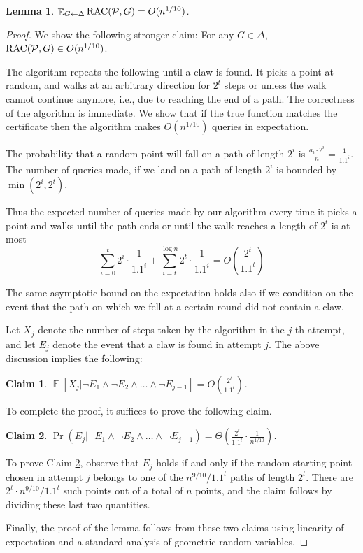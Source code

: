 \documentclass[11pt]{article}
\numberwithin{equation}{section}
\newtheorem{lemma}[lemma]{Lemma}
\newtheorem{claim}[claim]{Claim}
\newcommand\E{\mathop{\mathbb E}}
\renewcommand{\P}{\mathcal{P}}
\newcommand{\1}{\mathbf{1}}
\newcommand{\beq}{\begin{equation}}
\newcommand{\eeq}{\end{equation}}
\begin{document}
\begin{lemma}
$\E_{G \leftarrow \Delta} \RACC(\P, G) = O(n^{1/10})$.
\end{lemma}


\begin{proof}
We show the following stronger claim: For any $G \in \Delta$, $\RACC(\P, G) \in O(n^{1/10})$. 

The algorithm repeats the following until a claw is found. It picks a point at random, and walks at an arbitrary direction for $2^t$ steps or unless the walk cannot continue anymore, i.e., due to reaching the end of a path. The correctness of the algorithm is immediate. We show that if the true function matches the certificate then the algorithm makes $O(n^{1/10})$ queries in expectation.

The probability that a random point will fall on a path of length $2^i$ is $\frac{a_i \cdot 2^i}{n} = \frac{1}{1.1^i}$. The number of queries made, if we land on a path of length $2^i$ is bounded by $\min(2^i, 2^t)$. 

Thus the expected number of queries made by our algorithm every time it picks a point and walks until the path ends or until the walk reaches a length of $2^t$ is at most
\beq \sum_{i=0}^{t} 2^i \cdot \frac{1}{1.1^i} + \sum_{i=t}^{\log n} 2^t \cdot \frac{1}{1.1^i} = O\left(\frac{2^t}{1.1^t}\right) \eeq

The same asymptotic bound on the expectation   holds also if we condition on the event that the path on which we fell at a certain round did not contain a claw. 

Let $X_j$ denote the number of steps taken by the algorithm in the $j$-th attempt, and let $E_j$ denote the event that a claw is found in attempt $j$. The above discussion implies the following:
\begin{claim}
$\E\left[X_j | \neg E_1 \wedge \neg E_2 \wedge \ldots \wedge \neg E_{j-1}\right] = O\left(\frac{2^t}{1.1^t}\right)$.
\end{claim}

To complete the proof, it suffices to prove the following claim.
\begin{claim} 
\label{claim:prob_claw_found}
$\Pr(E_j | \neg E_1 \wedge \neg E_2 \wedge \ldots \wedge \neg E_{j-1}) = \Theta\left(\frac{2^t}{1.1^t} \cdot \frac{1}{n^{1/10}} \right)$.
\end{claim}
To prove Claim \ref{claim:prob_claw_found}, observe that $E_j$ holds if and only if the random starting point chosen in attempt $j$ belongs to one of the $n^{9/10} / 1.1^t$ paths of length $2^{t}$. There are $2^t \cdot n^{9/10} / 1.1^t$ such points out of a total of $n$ points, and the claim follows by dividing these last two quantities.

Finally, the proof of the lemma follows from these two claims using linearity of expectation and a standard analysis of geometric random variables.
\end{proof}
\end{document}
